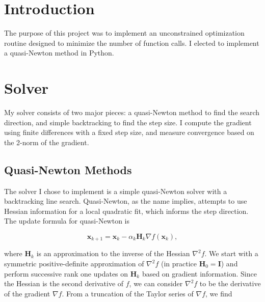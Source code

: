\documentclass{article}
\newcommand{\bs}[1]{\boldsymbol{#1}}
\begin{document}



\section{Introduction}
The purpose of this project was to implement an unconstrained optimization routine designed to minimize the number of function calls. I elected to implement a quasi-Newton method in Python.

\section{Solver}
My solver consists of two major pieces: a quasi-Newton method to find the search direction, and simple backtracking to find the step size. I compute the gradient using finite differences with a fixed step size, and measure convergence based on the 2-norm of the gradient.

\subsection{Quasi-Newton Methods}
The solver I chose to implement is a simple quasi-Newton solver with a backtracking line search. Quasi-Newton, as the name implies, attempts to use Hessian information for a local quadratic fit, which informs the step direction. The update formula for quasi-Newton is

\begin{equation}
\bs{x}_{k+1} = \bs{x}_{k} - \alpha_k \bs{H}_k \nabla f(\bs{x}_k),
\end{equation}

where $\bs{H}_k$ is an approximation to the inverse of the Hessian $\nabla^2 f$. We start with a symmetric positive-definite approximation of $\nabla^2 f$ (in practice $\bs{H}_0=\bs{I}$) and perform successive rank one updates on $\bs{H}_k$ based on gradient information. Since the Hessian is the second derivative of $f$, we can consider $\nabla^2 f$ to be the derivative of the gradient $\nabla f$. From a truncation of the Taylor series of $\nabla f$, we find
\end{document}
